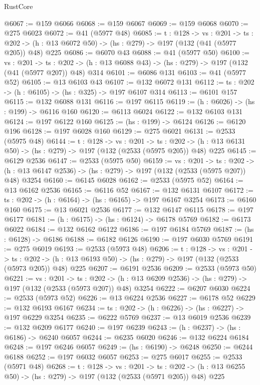 \begin{lexlean}{RustCore}
\begin{coremodule}
@6067 := @159 @6066
@6068 := @159 @6067
@6069 := @159 @6068
@6070 := @275 @6023
@6072 := @41 (@5977 @48)
@6085 := {t : @128} ->
  {vs : @201} ->
  {ts : @202} -> (h : @13 @6072 @50) -> (hs : @279) -> @197 (@132 (@41 (@5977 @205)) @48) @225
@6086 := @6070 @43
@6088 := @41 (@5977 @50)
@6100 := {vs : @201} ->
  {ts : @202} -> (h : @13 @6088 @43) -> (hs : @279) -> @197 (@132 (@41 (@5977 @207)) @48) @314
@6101 := @6086 @131
@6103 := @41 (@5977 @52)
@6105 := @13 @6103 @43
@6107 := @132 @6072 @131
@6112 := {ts : @202} -> (h : @6105) -> (hs : @325) -> @197 @6107 @314
@6113 := @6101 @157
@6115 := @132 @6088 @131
@6116 := @197 @6115
@6119 := (h : @6026) -> (hs : @199) -> @6116 @160
@6120 := @6113 @6024
@6122 := @132 @6103 @131
@6124 := @197 @6122 @160
@6125 := (hs : @199) -> @6124
@6126 := @6120 @196
@6128 := @197 @6028 @160
@6129 := @275 @6021
@6131 := @2533 (@5975 @48)
@6144 := {t : @128} ->
  {vs : @201} ->
  {ts : @202} -> (h : @13 @6131 @50) -> (hs : @279) -> @197 (@132 (@2533 (@5975 @205)) @48) @225
@6145 := @6129 @2536
@6147 := @2533 (@5975 @50)
@6159 := {vs : @201} ->
  {ts : @202} -> (h : @13 @6147 @2536) -> (hs : @279) -> @197 (@132 (@2533 (@5975 @207)) @48) @3254
@6160 := @6145 @6028
@6162 := @2533 (@5975 @52)
@6164 := @13 @6162 @2536
@6165 := @6116 @52
@6167 := @132 @6131 @6107
@6172 := {ts : @202} -> (h : @6164) -> (hs : @6165) -> @197 @6167 @3254
@6173 := @6160 @160
@6175 := @13 @6021 @2536
@6177 := @132 @6147 @6115
@6178 := @197 @6177
@6181 := (h : @6175) -> (hs : @6124) -> @6178 @5769
@6182 := @6173 @6022
@6184 := @132 @6162 @6122
@6186 := @197 @6184 @5769
@6187 := (hs : @6128) -> @6186
@6188 := @6182 @6126
@6190 := @197 @6030 @5769
@6191 := @275 @6019
@6193 := @2533 (@5973 @48)
@6206 := {t : @128} ->
  {vs : @201} ->
  {ts : @202} -> (h : @13 @6193 @50) -> (hs : @279) -> @197 (@132 (@2533 (@5973 @205)) @48) @225
@6207 := @6191 @2536
@6209 := @2533 (@5973 @50)
@6221 := {vs : @201} ->
  {ts : @202} -> (h : @13 @6209 @2536) -> (hs : @279) -> @197 (@132 (@2533 (@5973 @207)) @48) @3254
@6222 := @6207 @6030
@6224 := @2533 (@5973 @52)
@6226 := @13 @6224 @2536
@6227 := @6178 @52
@6229 := @132 @6193 @6167
@6234 := {ts : @202} -> (h : @6226) -> (hs : @6227) -> @197 @6229 @3254
@6235 := @6222 @5769
@6237 := @13 @6019 @2536
@6239 := @132 @6209 @6177
@6240 := @197 @6239
@6243 := (h : @6237) -> (hs : @6186) -> @6240 @6057
@6244 := @6235 @6020
@6246 := @132 @6224 @6184
@6248 := @197 @6246 @6057
@6249 := (hs : @6190) -> @6248
@6250 := @6244 @6188
@6252 := @197 @6032 @6057
@6253 := @275 @6017
@6255 := @2533 (@5971 @48)
@6268 := {t : @128} ->
  {vs : @201} ->
  {ts : @202} -> (h : @13 @6255 @50) -> (hs : @279) -> @197 (@132 (@2533 (@5971 @205)) @48) @225

\end{coremodule}
\end{lexlean}
